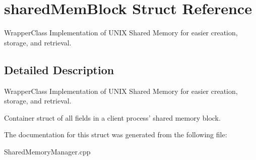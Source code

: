 \hypertarget{structsharedMemBlock}{\section{shared\-Mem\-Block Struct Reference}
\label{structsharedMemBlock}
}


Wrapper\-Class Implementation of U\-N\-I\-X Shared Memory for easier creation, storage, and retrieval.  




\subsection{Detailed Description}
Wrapper\-Class Implementation of U\-N\-I\-X Shared Memory for easier creation, storage, and retrieval. 

Container struct of all fields in a client process' shared memory block. 

The documentation for this struct was generated from the following file\-:\begin{DoxyCompactItemize}
\item 
Shared\-Memory\-Manager.\-cpp\end{DoxyCompactItemize}
